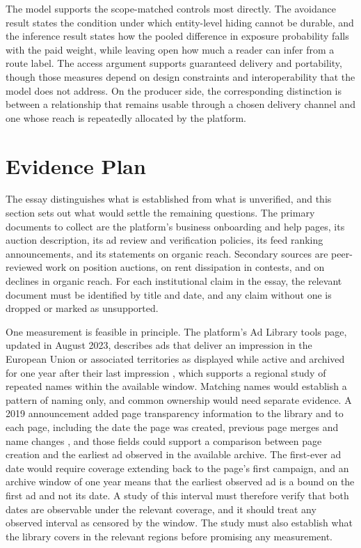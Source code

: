 \documentclass[11pt]{article}
\theoremstyle{definition}
\begin{document}
The model supports the scope-matched controls most directly. The avoidance result states the condition under which entity-level hiding cannot be durable, and the inference result states how the pooled difference in exposure probability falls with the paid weight, while leaving open how much a reader can infer from a route label. The access argument supports guaranteed delivery and portability, though those measures depend on design constraints and interoperability that the model does not address. On the producer side, the corresponding distinction is between a relationship that remains usable through a chosen delivery channel and one whose reach is repeatedly allocated by the platform.

\section{Evidence Plan}

The essay distinguishes what is established from what is unverified, and this section sets out what would settle the remaining questions. The primary documents to collect are the platform's business onboarding and help pages, its auction description, its ad review and verification policies, its feed ranking announcements, and its statements on organic reach. Secondary sources are peer-reviewed work on position auctions, on rent dissipation in contests, and on declines in organic reach. For each institutional claim in the essay, the relevant document must be identified by title and date, and any claim without one is dropped or marked as unsupported.

One measurement is feasible in principle. The platform's Ad Library tools page, updated in August 2023, describes ads that deliver an impression in the European Union or associated territories as displayed while active and archived for one year after their last impression \cite{metalibrary}, which supports a regional study of repeated names within the available window. Matching names would establish a pattern of naming only, and common ownership would need separate evidence. A 2019 announcement added page transparency information to the library and to each page, including the date the page was created, previous page merges and name changes \cite{meta2019}, and those fields could support a comparison between page creation and the earliest ad observed in the available archive. The first-ever ad date would require coverage extending back to the page's first campaign, and an archive window of one year means that the earliest observed ad is a bound on the first ad and not its date. A study of this interval must therefore verify that both dates are observable under the relevant coverage, and it should treat any observed interval as censored by the window. The study must also establish what the library covers in the relevant regions before promising any measurement.
\end{document}
